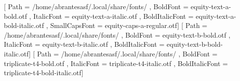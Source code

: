 %
%
%


\ifxetex
  \usepackage[tuenc]{fontspec}
  \setmainfont{equity-text-a-regular.otf}[
    Path           = /home/abrantesasf/.local/share/fonts/ ,
    BoldFont       = equity-text-a-bold.otf                ,
    ItalicFont     = equity-text-a-italic.otf              ,
    BoldItalicFont = equity-text-a-bold-italic.otf         ,
    SmallCapsFont  = equity-caps-a-regular.otf]
  \setsansfont{equity-text-b-regular.otf}[
    Path           = /home/abrantesasf/.local/share/fonts/ ,
    BoldFont       = equity-text-b-bold.otf                ,
    ItalicFont     = equity-text-b-italic.otf              ,
    BoldItalicFont = equity-text-b-bold-italic.otf]      
  \setmonofont{triplicate-t4-regular.otf}[
    Path           = /home/abrantesasf/.local/share/fonts/ ,
    BoldFont       = triplicate-t4-bold.otf                ,
    ItalicFont     = triplicate-t4-italic.otf              ,
    BoldItalicFont = triplicate-t4-bold-italic.otf]
  \usepackage{fontawesome5}
\else
  \usepackage[T1]{fontenc}
  \usepackage[utf8]{inputenc}
  \usepackage{lmodern}
\fi
